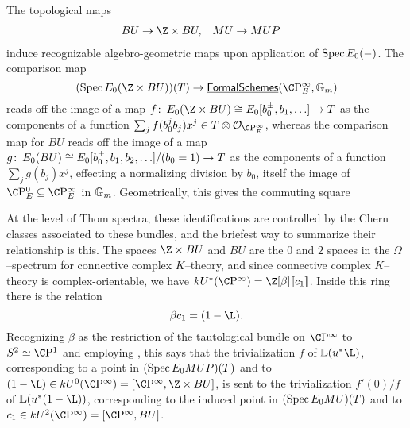 \begin{remark}\label{BUtoBUZ}
The topological maps
\begin{align*}
BU & \to \Z \times BU, &
MU & \to MUP
\end{align*}
induce recognizable algebro-geometric maps upon application of $\operatorname{Spec} E_0(-)$.  The comparison map \[(\Spec E_0(\Z \times BU))(T) \to \InternalHom{FormalSchemes}(\CP^\infty_E, \Gm)\] reads off the image of a map $f\co E_0(\Z \times BU) \cong E_0[b_0^\pm, b_1, \ldots] \to T$ as the components of a function $\sum_j f(b_0^j b_j) x^j \in T \otimes \sheaf O_{\CP^\infty_E}$, whereas the comparison map for $BU$ reads off the image of a map $g\colon\thinspace E_0(BU) \cong E_0[b_0^\pm, b_1, b_2, \ldots] / (b_0 = 1) \to T$ as the components of a function $\sum_j g(b_j)x^j$, effecting a normalizing division by $b_0$, itself the image of $\CP^0_E \subseteq \CP^\infty_E$ in $\mathbb G_m$.  Geometrically, this gives the commuting square
\begin{center}
\end{center}

At the level of Thom spectra, these identifications are controlled by the Chern classes associated to these bundles, and the briefest way to summarize their relationship is this.  The spaces $\Z \times BU$ and $BU$ are the $0${\th} and $2${\nd} spaces in the $\Omega$--spectrum for connective complex $K$--theory, and since connective complex $K$--theory is complex-orientable, we have $kU^*(\CP^\infty) = \Z[\beta]\ps{c_1}$.  Inside this ring there is the relation \[\beta c_1 = (1 - \L).\]  Recognizing $\beta$ as the restriction of the tautological bundle on $\CP^\infty$ to $S^2 \simeq \CP^1$ and employing , this says that the trivialization $f$ of $\ThomSheaf{u^* \L}$, corresponding to a point in $(\operatorname{Spec} E_0 MUP)(T)$ and to $(1 - \L) \in kU^0(\CP^\infty) = [\CP^\infty, \Z \times BU]$, is sent to the trivialization $f'(0) / f$ of $\ThomSheaf{u^*(1 - \L)}$, corresponding to the induced point in $(\operatorname{Spec} E_0 MU)(T)$ and to $c_1 \in kU^2(\CP^\infty) = [\CP^\infty, BU]$.
\end{remark}


